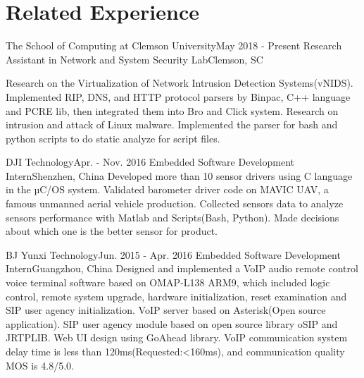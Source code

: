 
\section{Related Experience}
  \subItemListStart
    \experienceSubItem
      {The School of Computing at Clemson University}{May 2018 - Present}
      {Research Assistant in Network and System Security Lab}{Clemson, SC}
      
      \detailItemListStart
          {Research on the Virtualization of Network Intrusion Detection Systems(vNIDS). Implemented RIP, DNS, and HTTP protocol parsers by Binpac, C++ language and PCRE lib, then integrated them into Bro and Click system.}
          {Research on intrusion and attack of Linux malware. Implemented the parser for bash and python scripts to do static analyze for script files.}
      \detailItemListEnd

    \experienceSubItem
      {DJI Technology}{Apr. - Nov. 2016}
      {Embedded Software Development Intern}{Shenzhen, China}
      \detailItemListStart
          {Developed more than 10 sensor drivers using C language in the µC/OS system. Validated barometer driver code on MAVIC UAV, a famous unmanned aerial vehicle production.}
          {Collected sensors data to analyze sensors performance with Matlab and Scripts(Bash, Python). Made decisions about which one is the better sensor for product.}
      \detailItemListEnd
    
    \experienceSubItem
      {BJ Yunxi Technology}{Jun. 2015 - Apr. 2016}
      {Embedded Software Development Intern}{Guangzhou, China}
      \detailItemListStart
          {Designed and implemented a VoIP audio remote control voice terminal software based on OMAP-L138 ARM9, which included logic control, remote system upgrade, hardware initialization, reset examination and SIP user agency initialization.}
          {VoIP server based on Asterisk(Open source application). SIP user agency module based on open source library oSIP and JRTPLIB. Web UI design using GoAhead library.}
          {VoIP communication system delay time is less than 120ms(Requested:<160ms), and communication quality MOS is 4.8/5.0.}

      \detailItemListEnd
  \subItemListEnd
